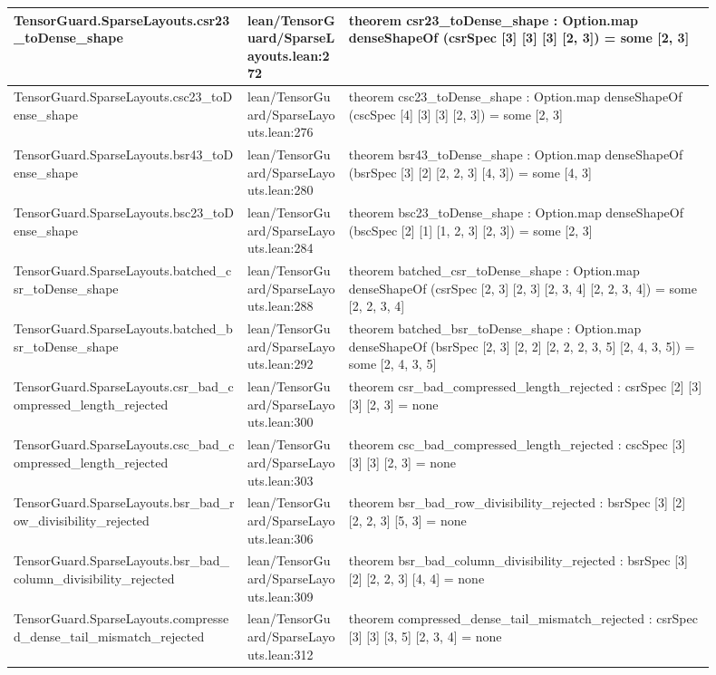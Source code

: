 \documentclass[10pt]{article}
\begin{document}
\begin{longtable}{|p{0.30\linewidth}|p{0.13\linewidth}|p{0.47\linewidth}|}
\hline
TensorGuard.SparseLayouts.csr23\_toDense\_shape & lean/TensorGuard/SparseLayouts.lean:272 & theorem csr23\_toDense\_shape : Option.map denseShapeOf (csrSpec [3] [3] [3] [2, 3]) = some [2, 3] \\
\hline
TensorGuard.SparseLayouts.csc23\_toDense\_shape & lean/TensorGuard/SparseLayouts.lean:276 & theorem csc23\_toDense\_shape : Option.map denseShapeOf (cscSpec [4] [3] [3] [2, 3]) = some [2, 3] \\
\hline
TensorGuard.SparseLayouts.bsr43\_toDense\_shape & lean/TensorGuard/SparseLayouts.lean:280 & theorem bsr43\_toDense\_shape : Option.map denseShapeOf (bsrSpec [3] [2] [2, 2, 3] [4, 3]) = some [4, 3] \\
\hline
TensorGuard.SparseLayouts.bsc23\_toDense\_shape & lean/TensorGuard/SparseLayouts.lean:284 & theorem bsc23\_toDense\_shape : Option.map denseShapeOf (bscSpec [2] [1] [1, 2, 3] [2, 3]) = some [2, 3] \\
\hline
TensorGuard.SparseLayouts.batched\_csr\_toDense\_shape & lean/TensorGuard/SparseLayouts.lean:288 & theorem batched\_csr\_toDense\_shape : Option.map denseShapeOf (csrSpec [2, 3] [2, 3] [2, 3, 4] [2, 2, 3, 4]) = some [2, 2, 3, 4] \\
\hline
TensorGuard.SparseLayouts.batched\_bsr\_toDense\_shape & lean/TensorGuard/SparseLayouts.lean:292 & theorem batched\_bsr\_toDense\_shape : Option.map denseShapeOf (bsrSpec [2, 3] [2, 2] [2, 2, 2, 3, 5] [2, 4, 3, 5]) = some [2, 4, 3, 5] \\
\hline
TensorGuard.SparseLayouts.csr\_bad\_compressed\_length\_rejected & lean/TensorGuard/SparseLayouts.lean:300 & theorem csr\_bad\_compressed\_length\_rejected : csrSpec [2] [3] [3] [2, 3] = none \\
\hline
TensorGuard.SparseLayouts.csc\_bad\_compressed\_length\_rejected & lean/TensorGuard/SparseLayouts.lean:303 & theorem csc\_bad\_compressed\_length\_rejected : cscSpec [3] [3] [3] [2, 3] = none \\
\hline
TensorGuard.SparseLayouts.bsr\_bad\_row\_divisibility\_rejected & lean/TensorGuard/SparseLayouts.lean:306 & theorem bsr\_bad\_row\_divisibility\_rejected : bsrSpec [3] [2] [2, 2, 3] [5, 3] = none \\
\hline
TensorGuard.SparseLayouts.bsr\_bad\_column\_divisibility\_rejected & lean/TensorGuard/SparseLayouts.lean:309 & theorem bsr\_bad\_column\_divisibility\_rejected : bsrSpec [3] [2] [2, 2, 3] [4, 4] = none \\
\hline
TensorGuard.SparseLayouts.compressed\_dense\_tail\_mismatch\_rejected & lean/TensorGuard/SparseLayouts.lean:312 & theorem compressed\_dense\_tail\_mismatch\_rejected : csrSpec [3] [3] [3, 5] [2, 3, 4] = none \\

\end{longtable}
\end{document}
